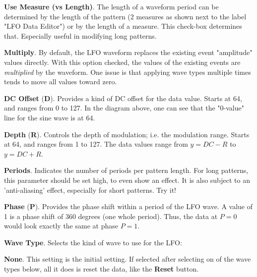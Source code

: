    \begin{enumber}
      \item \textbf{Use Measure (vs Length)}.
         The length of a waveform period can be determined by the length of the
         pattern (2 measures as shown next to the label "LFO Data Editor") or
         by the length of a measure. This check-box determines that.
         Especially useful in modifying long patterns.
      \item \textbf{Multiply}.
         By default, the LFO waveform replaces the existing event
         "amplitude" values directly.
         With this option checked, the values of the existing events
         are \textsl{multiplied} by the waveform.
         One issue is that applying wave types multiple times tends
         to move all values toward zero.
      \item \textbf{DC Offset} (\textbf{D}).
         Provides a kind of DC offset for the data value. Starts at 64, and
         ranges from 0 to 127.
         In the diagram above, one can see that the "0-value" line for the sine
         wave is at 64.
      \item \textbf{Depth} (\textbf{R}).
         Controls the depth of modulation; i.e. the modulation range.
         Starts at 64, and ranges from 1 to 127.
         The data values range from \( y = DC - R \) to \( y = DC + R\).
      \item \textbf{Periods}.
         Indicates the number of periods per pattern length.
         For long patterns, this parameter should be set high,
         to even show an effect.  It is also subject to an 'anti-aliasing'
         effect, especially for short patterns.
         Try it!
      \item \textbf{Phase} (\textbf{P}).
         Provides the phase shift within a period of the LFO wave.
         A value of 1 is a phase shift of 360 degrees (one whole period).
         Thus, the data at \( P = 0 \) would look exactly the same at phase
         \( P = 1\).
      \item \textbf{Wave Type}.
         Selects the kind of wave to use for the LFO:
         \begin{enumber}
            \item \textbf{None}.
               This setting is the initial setting.
               If selected after selecting on of the wave types below,
               all it does is reset the data, like the
               \textbf{Reset} button.

\end{enumber}
\end{enumber}
